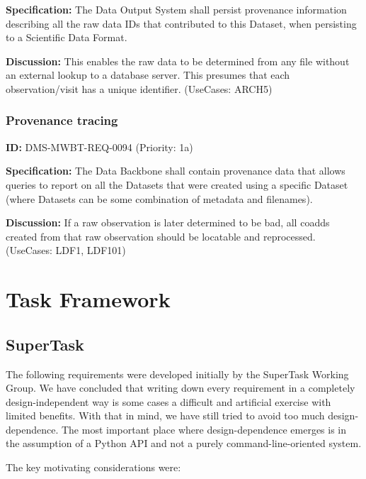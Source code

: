 \documentclass[SE,toc,lsstdraft]{lsstdoc}
\begin{document}
\textbf{Specification:}
The Data Output System shall persist provenance information describing all the raw data IDs that contributed to this Dataset, when persisting to a Scientific Data Format.

\textbf{Discussion:}
This enables the raw data to be determined from any file without an external lookup to a database server. This presumes that each observation/visit has a unique identifier. (UseCases: ARCH5)

\subsubsection{Provenance tracing}

\label{DMS-MWBT-REQ-0094}
\textbf{ID:} DMS-MWBT-REQ-0094 (Priority: 1a)

\textbf{Specification:}
The Data Backbone shall contain provenance data that allows queries to report on all the Datasets that were created using a specific Dataset (where Datasets can be some combination of metadata and filenames).

\textbf{Discussion:}
If a raw observation is later determined to be bad, all coadds created from that raw observation should be locatable and reprocessed. (UseCases: LDF1, LDF101)

\section{Task Framework}

\subsection{SuperTask}

The following requirements were developed initially by the SuperTask Working Group. We have concluded that writing down every requirement in a completely design-independent way is some cases a difficult and artificial exercise with limited benefits. With that in mind, we have still tried to avoid too much design-dependence. The most important place where design-dependence emerges is in the assumption of a Python API and not a purely command-line-oriented system.

The key motivating considerations were:
\end{document}
